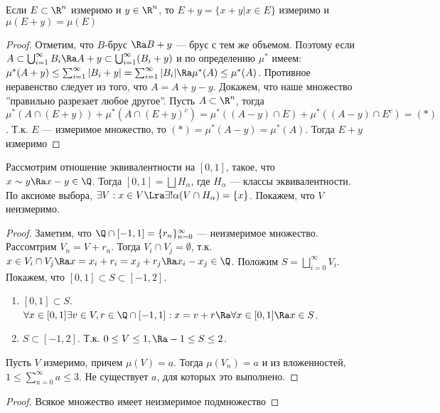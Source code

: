 \begin{lemma}
    Если \(E \subset \R^n\) измеримо и \(y \in \R^n\), то \(E + y = \{x + y | x \in E\}\) измеримо и \(\mu(E + y) = \mu(E)\)
\end{lemma}
\begin{proof}
    Отметим, что \(B\)-брус \(\Ra B + y\) --- брус с тем же объемом. Поэтому если \(A \subset \bigcup_{i = 1}^\infty B_i \Ra A + y \subset \bigcup_{i = 1}^\infty (B_i + y)\) и по определению \(\mu^*\) имеем: \(\mu^*(A + y) \le \sum_{i = 1}^\infty |B_i + y| = \sum_{i = 1}^\infty |B_i| \Ra \mu^*(A) \le \mu^*(A)\). Противное неравенство следует из того, что \(A = A + y - y\). Докажем, что наше множество ''правильно разрезает любое другое''. Пусть \(A \subset \R^n\), тогда \(\mu^*(A \cap (E + y)) + \mu^*(A \cap (E + y)^c) = \mu^*((A - y) \cap E) + \mu^*((A - y) \cap E^c) = (*)\). Т.к. \(E\) --- измеримое множество, то \((*) = \mu^*(A - y) = \mu^*(A)\). Тогда \(E + y\) измеримо
\end{proof}

\begin{example}
    Рассмотрим отношение эквивалентности на \([0, 1]\), такое, что \(x \sim y \Ra x - y \in \Q\). Тогда \([0, 1] = \bigsqcup H_\alpha\), где \(H_\alpha\) --- классы эквивалентности. По аксиоме выбора, \(\exists V: x \in V \Lra \exists! \alpha (V \cap H_\alpha) = \{x\}\). Покажем, что \(V\) неизмеримо.
\end{example}
\begin{proof}
    Заметим, что \(\Q \cap [-1, 1] = \{r_n\}_{n = 0}^\infty\) --- неизмеримое множество. Рассомтрим \(V_n = V + r_n\). Тогда \(V_i \cap V_j = \emptyset\), т.к. \(x \in V_i \cap V_j \Ra x = x_i + r_i = x_j + r_j \Ra x_i - x_j \in \Q\). Положим \(S = \bigsqcup_{i = 0}^\infty V_i\). Покажем, что \([0, 1] \subset S \subset [-1, 2]\).
    \begin{enumerate}
        \item[] \([0, 1] \subset S\). \(\forall x \in [0, 1] \exists v \in V, r \in \Q \cap [-1, 1]: x = v + r \Ra \forall x \in [0, 1] \Ra x \in S\).
        \item[] \(S \subset [-1, 2]\). Т.к. \(0 \le V \le 1, \Ra -1 \le S \le 2\).
    \end{enumerate}
    Пусть \(V\) измеримо, причем \(\mu(V) = a\). Тогда \(\mu(V_n) = a\) и из вложенностей, \(1 \le \sum_{n = 0}^\infty a \le 3\). Не существует \(a\), для которых это выполнено.
\end{proof}

\begin{proof}
    Всякое множество имеет неизмеримое подмножество
\end{proof}

